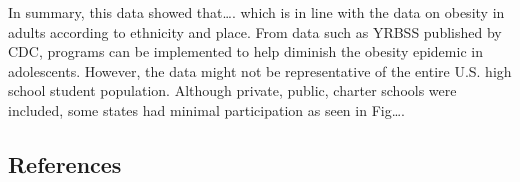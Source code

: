 \documentclass[
  letterpaper,
  DIV=11,
  numbers=noendperiod]{scrartcl}
\begin{document}
In summary, this data showed that\ldots. which is in line with the data
on obesity in adults according to ethnicity and place. From data such as
YRBSS published by CDC, programs can be implemented to help diminish the
obesity epidemic in adolescents. However, the data might not be
representative of the entire U.S. high school student population.
Although private, public, charter schools were included, some states had
minimal participation as seen in Fig\ldots.

\newpage

\subsection{References}\label{references}
\end{document}
